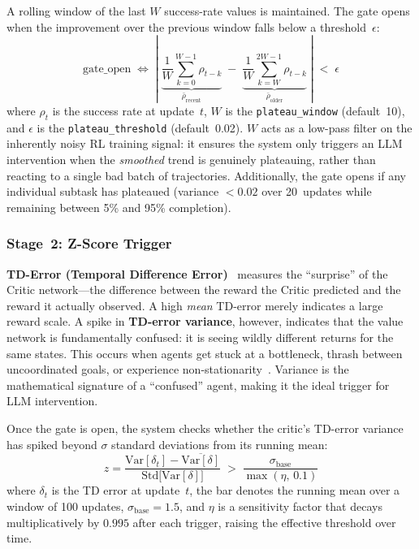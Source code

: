 A rolling window of the last $W$ success-rate values is maintained.
The gate opens when the improvement over the previous window falls
below a threshold~$\epsilon$:
\begin{equation}
\label{eq:plateau_gate}
    \text{gate\_open}
    \;\Longleftrightarrow\;
    \left|\;
        \underbrace{\frac{1}{W}\sum_{k=0}^{W-1}
            \rho_{t-k}}_{\bar{\rho}_{\text{recent}}}
        \;-\;
        \underbrace{\frac{1}{W}\sum_{k=W}^{2W-1}
            \rho_{t-k}}_{\bar{\rho}_{\text{older}}}
    \;\right|
    \;<\;
    \epsilon
\end{equation}
where $\rho_t$ is the success rate at update~$t$, $W$ is the
\texttt{plateau\_window} (default~10), and $\epsilon$ is the
\texttt{plateau\_threshold} (default~0.02).
$W$ acts as a low-pass filter on the inherently noisy RL training signal:
it ensures the system only triggers an LLM intervention when the
\emph{smoothed} trend is genuinely plateauing, rather than reacting to a
single bad batch of trajectories.
Additionally, the gate opens if any individual subtask
has plateaued (variance $< 0.02$ over 20~updates while
remaining between 5\% and 95\% completion).

\subsubsection{Stage~2: Z-Score Trigger}

\textbf{TD-Error (Temporal Difference Error)}~\parencite{Sutton_Barto_2020} measures the ``surprise''
of the Critic network---the difference between the reward the Critic
predicted and the reward it actually observed.
A high \emph{mean} TD-error merely indicates a large reward scale.
A spike in \textbf{TD-error variance}, however, indicates that the value
network is fundamentally confused: it is seeing wildly different returns
for the same states.
This occurs when agents get stuck at a bottleneck, thrash between
uncoordinated goals, or experience non-stationarity~\parencite{Foerster_Nardelli_Farquhar_Afouras_Torr_Kohli_Whiteson_2018}.
Variance is the mathematical signature of a ``confused'' agent, making
it the ideal trigger for LLM intervention.

Once the gate is open, the system checks whether the critic's
TD-error variance has spiked beyond $\sigma$ standard deviations from
its running mean:
\begin{equation}
\label{eq:zscore_trigger}
    z = \frac{
        \text{Var}[\delta_t] - \overline{\text{Var}[\delta]}
    }{
        \text{Std}\bigl[\text{Var}[\delta]\bigr]
    }
    \;>\;
    \frac{\sigma_{\text{base}}}{\max(\eta,\, 0.1)}
\end{equation}
where $\delta_t$ is the TD error at update~$t$, the bar denotes the
running mean over a window of 100 updates, $\sigma_{\text{base}}=1.5$,
and $\eta$ is a sensitivity factor that decays multiplicatively by
$0.995$ after each trigger, raising the effective threshold over time.

